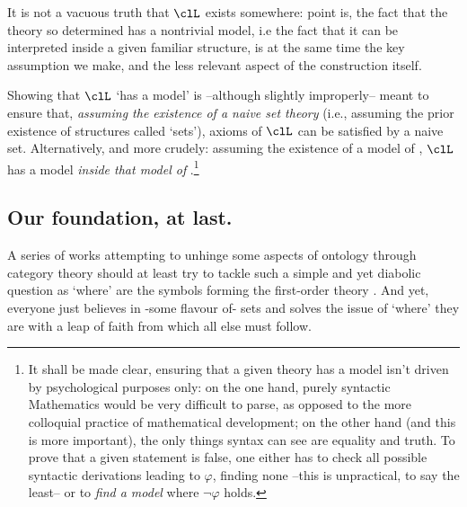 It is not a vacuous truth that $\clL$ exists somewhere: point is, the fact that the theory so determined has a nontrivial model, i.e the fact that it can be interpreted inside a given familiar structure, is at the same time the key assumption we make, and the less relevant aspect of the construction itself.

Showing that $\clL$ `has a model' is --although slightly improperly-- meant to ensure that, \emph{assuming the existence of a naive set theory} (i.e., assuming the prior existence of structures called `sets'), axioms of $\clL$ can be satisfied by a naive set. Alternatively, and more crudely: assuming the existence of a model of , $\clL$ has a model \emph{inside that model of }.\footnote{It shall be made clear, ensuring that a given theory has a model isn't driven by psychological purposes only: on the one hand, purely syntactic Mathematics would be very difficult to parse, as opposed to the more colloquial practice of mathematical development; on the other hand (and this is more important), the only things syntax can see are equality and truth. To prove that a given statement is false, one either has to check all possible syntactic derivations leading to $\varphi$, finding none --this is unpractical, to say the least-- or to \emph{find a model} where $\lnot\varphi$ holds.}

\subsection{Our foundation, at last.} A series of works attempting to unhinge some aspects of ontology through category theory should at least try to tackle such a simple and yet diabolic question as `where' are the symbols forming the first-order theory . And yet, everyone just believes in -some flavour of- sets and solves the issue of `where' they are with a leap of faith from which all else must follow.

